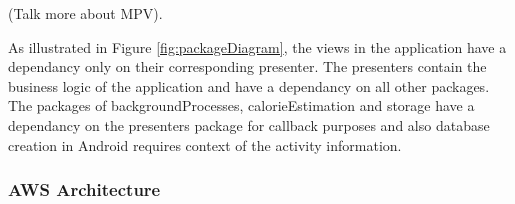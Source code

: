 (Talk more about MPV).

As illustrated in Figure \ref{fig:packageDiagram}, the views in the application have a dependancy only on their corresponding presenter.
The presenters contain the business logic of the  application and have a dependancy on all other packages.
The packages of backgroundProcesses, calorieEstimation and storage have a dependancy on the presenters package for callback purposes and also database creation in Android requires context of the activity information.

\subsubsection*{AWS Architecture}

